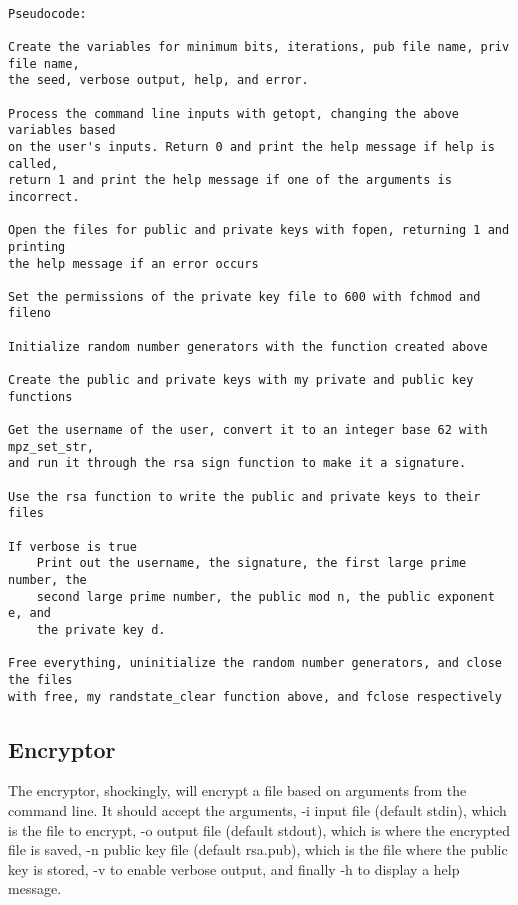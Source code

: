 \documentclass[11pt]{article}
\begin{document}
\begin{verbatim}

Pseudocode:

Create the variables for minimum bits, iterations, pub file name, priv file name,
the seed, verbose output, help, and error.

Process the command line inputs with getopt, changing the above variables based
on the user's inputs. Return 0 and print the help message if help is called,
return 1 and print the help message if one of the arguments is incorrect.

Open the files for public and private keys with fopen, returning 1 and printing
the help message if an error occurs

Set the permissions of the private key file to 600 with fchmod and fileno

Initialize random number generators with the function created above

Create the public and private keys with my private and public key functions

Get the username of the user, convert it to an integer base 62 with mpz_set_str,
and run it through the rsa sign function to make it a signature.

Use the rsa function to write the public and private keys to their files

If verbose is true
    Print out the username, the signature, the first large prime number, the
    second large prime number, the public mod n, the public exponent e, and
    the private key d.

Free everything, uninitialize the random number generators, and close the files
with free, my randstate_clear function above, and fclose respectively

\end{verbatim}

\subsection{Encryptor}

The encryptor, shockingly, will encrypt a file based on arguments from the command line. It should accept the arguments, -i input file (default stdin), which is the file to encrypt, -o output file (default stdout), which is where the encrypted file is saved, -n public key file (default rsa.pub), which is the file where the public key is stored, -v to enable verbose output, and finally -h to display a help message.
\end{document}
